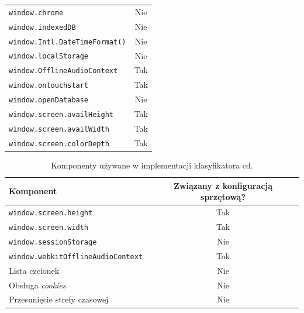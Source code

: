 \begin{table}
\begin{tabular}{|l|c|}
		\texttt{window.chrome}                      & Nie                                    \\
		\texttt{window.indexedDB}                   & Nie                                    \\
		\texttt{window.Intl.DateTimeFormat()}       & Nie                                    \\
		\texttt{window.localStorage}                & Nie                                    \\
		\texttt{window.OfflineAudioContext}         & Tak                                    \\
		\texttt{window.ontouchstart}                & Tak                                    \\
		\texttt{window.openDatabase}                & Nie                                    \\
		\texttt{window.screen.availHeight}          & Tak                                    \\
		\texttt{window.screen.availWidth}           & Tak                                    \\
		\texttt{window.screen.colorDepth}           & Tak                                    \\
		\hline
	\end{tabular}
\end{table}

\begin{table}
	\centering
	\caption{Komponenty używane w implementacji klasyfikatora cd.}
	\begin{tabular}{|l|c|}
		\hline
		Komponent                                 & Związany z konfiguracją sprzętową? \\
		\hline
		\texttt{window.screen.height}             & Tak                                    \\
		\texttt{window.screen.width}              & Tak                                    \\
		\texttt{window.sessionStorage}            & Nie                                    \\
		\texttt{window.webkitOfflineAudioContext} & Tak                                    \\
		Lista czcionek                            & Nie                                    \\
		Obsługa \emph{cookies}                   & Nie                                    \\
		Przesunięcie strefy czasowej             & Nie                                    \\
		\hline
	\end{tabular}
\end{table}


